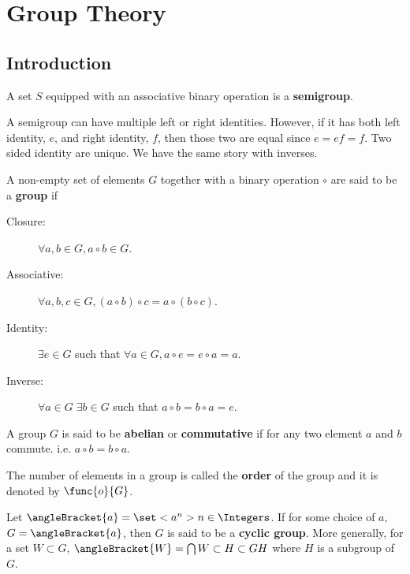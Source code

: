 \chapter{Group Theory}
\section{Introduction}
\begin{definition}
    A set \(S\) equipped with an associative binary operation is a \textbf{semigroup}.
\end{definition}
A semigroup can have multiple left or right identities. However, if it has both left identity, \(e\), and right identity, \(f\), then those two are equal since \(e = ef = f\). Two sided identity are unique. We have the same story with inverses.

\begin{definition}
    A non-empty set of elements \(G\) together with a binary operation \(\circ\) are said to be a \textbf{group} if 
    \begin{description}
        \item[Closure:] \(\forall a,b \in G, a \circ b \in G\).
        \item[Associative:] \(\forall a,b,c \in G, (a \circ b ) \circ c = a \circ (b \circ c)\).
        \item[Identity:] \(\exists e \in G\) such that \(\forall a\in G, a \circ e = e \circ a = a\).  
        \item[Inverse:] \(\forall a \in G \; \exists b \in G\) such that \(a \circ b = b \circ a = e\).  
    \end{description}
\end{definition}

\begin{definition}
    A group \(G\) is said to be \textbf{abelian} or \textbf{commutative} if for any two element \(a\) and \(b\) commute. i.e. \(a \circ b = b \circ a\).
\end{definition}

\begin{definition}
    The number of elements in a group is called the \textbf{order} of the group and it is denoted by \(\func{o}{G}\).
\end{definition}

\begin{definition}
    Let \(\angleBracket{a} = \set<a^n>{n \in \Integers}\). If for some choice of \(a\), \(G = \angleBracket{a}\), then \(G\) is said to be a \textbf{cyclic group}. More generally, for a set \(W \subset G\), \(\angleBracket{W} = \bigcap{W \subset H \subset G} H\) where \(H\) is a subgroup of \(G\).
\end{definition}

